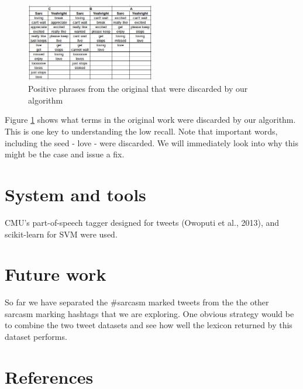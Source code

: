 \documentclass[11pt]{article}
\begin{document}
\begin{figure}
\includegraphics[width=0.5\textwidth]{discarded-terms-in-original-work}
\caption{Positive phrases from the original that were discarded by our algorithm}
\label{fig:discarded-terms-in-original-work}
\end{figure}

Figure \ref{fig:discarded-terms-in-original-work} shows what terms in the original work were discarded by our algorithm. This is one key to understanding the low recall. Note that important words, including the seed - love - were discarded. We will immediately look into why this might be the case and issue a fix.

\section{System and tools}

CMU’s part-of-speech tagger designed for tweets (Owoputi et al., 2013), and scikit-learn \cite{scikit-learn} for SVM were used.

\section{Future work}

So far we have separated the \#sarcasm marked tweets from the the other sarcasm marking hashtags that we are exploring. One obvious strategy would be to combine the two tweet datasets and see how well the lexicon returned by this dataset performs.

\section{References}


\end{document}
